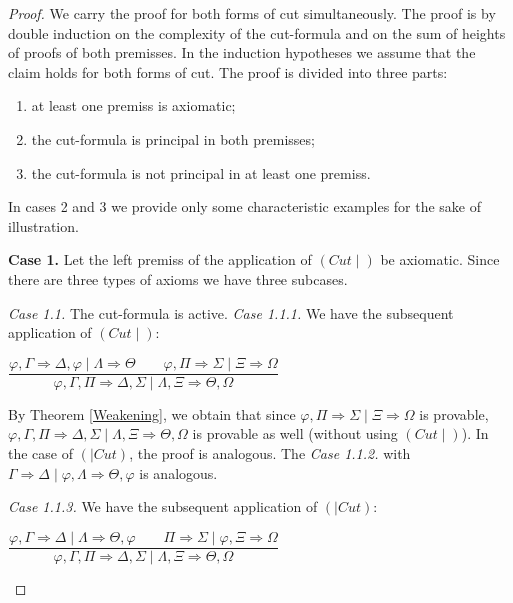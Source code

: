 \documentclass[11pt,a4paper,titlepage]{article}
\theoremstyle{definition}
\newcommand{\3}{\vspace{.3in}}
\newcommand{\2}{\vspace{.2in}}
\newcommand{\1}{\vspace{.1in}}
\newcommand{\5}{\vspace{.05in}}
\begin{document}
\begin{proof} We carry the proof for both forms of cut simultaneously. The proof is by 
	double induction on the complexity of the cut-formula and on the
	sum of heights of proofs of both premisses. In the induction hypotheses we assume that the claim holds for
	both forms of cut. The proof is divided into three parts: 
\begin{enumerate}\itemsep=0pt
\item at least one premiss is axiomatic;
\item the cut-formula is principal in both premisses;
\item the cut-formula is not principal in at least one premiss.
\end{enumerate}

In cases 2 and 3 we provide only some characteristic examples for the sake of illustration.

\1

\textbf{Case 1.} Let the left premiss of the application of $ (Cut\mid) $ be axiomatic. Since there are three types of axioms we have three subcases. 

\textit{Case 1.1.} The cut-formula is active. \textit{Case 1.1.1.} We have the subsequent application of  $ (Cut\mid) $:
\begin{center}
	$\dfrac{\varphi,\Gamma 
	\Rightarrow  \Delta, \varphi \mid \Lambda\Rightarrow\Theta \qquad
	\varphi, \Pi  \Rightarrow  \Sigma \mid \Xi\Rightarrow\Omega} {\varphi,\Gamma, \Pi  \Rightarrow  \Delta, \Sigma \mid \Lambda, \Xi\Rightarrow\Theta, \Omega}$
\end{center}

By Theorem \ref{Weakening}, we obtain that since $ \varphi, \Pi  \Rightarrow  \Sigma \mid \Xi\Rightarrow\Omega $ is provable, 
 $ \varphi,\Gamma, \Pi  \Rightarrow  \Delta, \Sigma \mid \Lambda, \Xi\Rightarrow\Theta, \Omega $ is provable as well (without using $ (Cut\mid) $). In the case of $ (\mid Cut) $, the proof is analogous. The \textit{Case 1.1.2.} with $\Gamma 
 \Rightarrow  \Delta \mid \varphi, \Lambda\Rightarrow\Theta, \varphi$ is analogous. 

\textit{Case 1.1.3.} We have the subsequent application of  $ (\mid Cut) $:
\begin{center}
	$\dfrac{\varphi,\Gamma 
	\Rightarrow  \Delta \mid \Lambda\Rightarrow\Theta, \varphi \qquad
	 \Pi  \Rightarrow  \Sigma \mid \varphi,\Xi\Rightarrow\Omega} {\varphi,\Gamma, \Pi  \Rightarrow  \Delta, \Sigma \mid \Lambda, \Xi\Rightarrow\Theta, \Omega}$
\end{center}


\end{proof}
\end{document}
